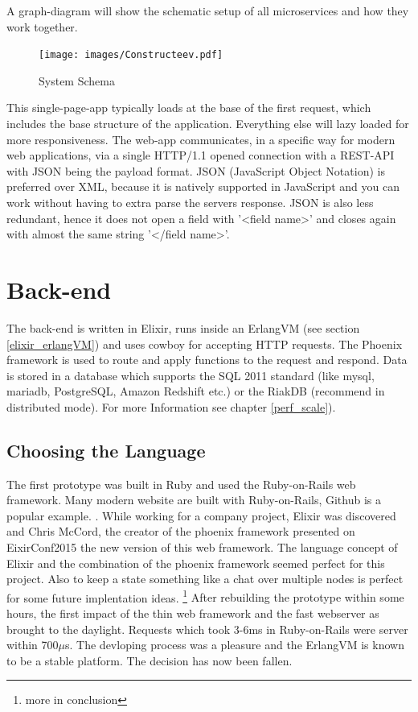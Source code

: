 A graph-diagram will show the schematic setup of all microservices and how they work together. 

\begin{figure}[!ht]
  \caption{System Schema}
  \centering
    \texttt{[image: images/Constructeev.pdf]}
\end{figure}


This single-page-app typically loads at the base of the first request, which includes the base structure of the application. Everything else will lazy loaded for more responsiveness. The web-app communicates, in a specific way for modern web applications, via a single HTTP/1.1 opened connection with a REST-API with JSON being the payload format. JSON (JavaScript Object Notation) is preferred over XML, because it is natively supported in JavaScript and you can work without having to extra parse the servers response. JSON is also less redundant, hence it does not open a field with '<field name>' and closes again with almost the same string '</field name>'.
 
\section{Back-end}
The back-end is written in Elixir, runs inside an ErlangVM (see section \ref{elixir_erlangVM}) and uses cowboy for accepting HTTP requests. The Phoenix framework is used to route and apply functions to the request and respond. Data is stored in a database which supports the SQL 2011 standard (like mysql, mariadb, PostgreSQL, Amazon Redshift etc.) or the RiakDB (recommend in distributed mode). For more Information see chapter \ref{perf_scale}).

\subsection{Choosing the Language}
\textcolor{newcode}{The first prototype was built in Ruby and used the Ruby-on-Rails web framework. Many modern website are built with Ruby-on-Rails, Github is a popular example. \cite{RORBW} \cite{DoesWhat}. While working for a company project, Elixir was discovered and Chris McCord, the creator of the phoenix framework presented on EixirConf2015 the new version of this web framework.
The language concept of Elixir and the combination of the phoenix framework seemed perfect for this project. Also to keep a state something like a chat over multiple nodes is perfect for some future implentation ideas. \footnote{more in conclusion}}
\textcolor{newcode}{
After rebuilding the prototype within some hours, the first impact of the thin web framework and the fast webserver as brought to the daylight. Requests which took 3-6ms in Ruby-on-Rails were server within 700$\mu$s.
The devloping process was a pleasure and the ErlangVM is known to be a stable platform. The decision has now been fallen.}

